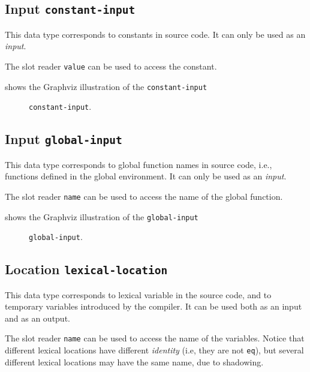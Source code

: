 \subsection{Input \texttt{constant-input}}

This data type corresponds to constants in source code.  It can only
be used as an \emph{input}.

The slot reader \texttt{value} can be used to access the constant. 

 shows the Graphviz illustration of the
\texttt{constant-input}

\begin{figure}
\begin{center}
\end{center}
\caption{\label{fig-constant-input}
\texttt{constant-input}.}
\end{figure}

\subsection{Input \texttt{global-input}}

This data type corresponds to global function names in source code,
i.e., functions defined in the global environment.  It can only be
used as an \emph{input}.

The slot reader \texttt{name} can be used to access the name of the
global function.

 shows the Graphviz illustration of the
\texttt{global-input}

\begin{figure}
\begin{center}
\end{center}
\caption{\label{fig-global-input}
\texttt{global-input}.}
\end{figure}

\subsection{Location \texttt{lexical-location}}

This data type corresponds to lexical variable in the source code, and
to temporary variables introduced by the compiler.  It can be used
both as an input and as an output.

The slot reader \texttt{name} can be used to access the name of the
variables.  Notice that different lexical locations have different
\emph{identity} (i.e, they are not \texttt{eq}), but several different
lexical locations may have the same name, due to shadowing.

